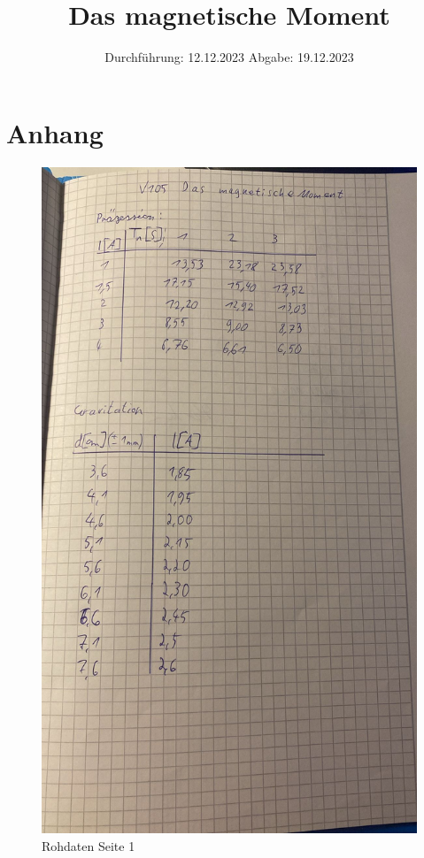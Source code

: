 

\subject{V105}
\title{Das magnetische Moment}
\date{%
  Durchführung: 12.12.2023
  \hspace{3em}
  Abgabe: 19.12.2023
}



\maketitle
\thispagestyle{empty}
\tableofcontents
\newpage






\printbibliography{}

\section{Anhang}
\begin{figure}
  \includegraphics[width=\textwidth]{Bilder/data1.jpg}
  \caption{Rohdaten Seite 1}
\end{figure}


